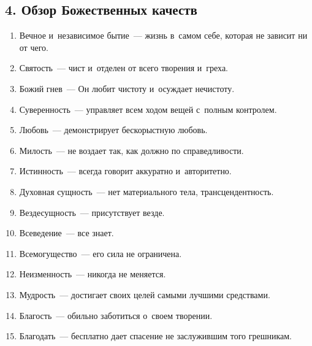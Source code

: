 \documentclass[a4paper,12pt]{article}
\begin{document}
\subsection{4.  Обзор Божественных качеств}
\begin{enumerate}
    \item Вечное и~независимое бытие~--- жизнь в~самом себе, которая не зависит ни от чего.
    \item Святость~--- чист и~отделен от всего творения и~греха.
    \item Божий гнев~--- Он любит чистоту и~осуждает нечистоту.
    \item Суверенность~--- управляет всем ходом вещей с~полным контролем.
    \item Любовь~--- демонстрирует бескорыстную любовь. 
    \item Милость~--- не воздает так, как должно по справедливости.
    \item Истинность~--- всегда говорит аккуратно и~авторитетно.
    \item Духовная сущность~--- нет материального тела, трансцендентность.
    \item Вездесущность~--- присутствует везде.
    \item Всеведение~--- все знает.
    \item Всемогущество~--- его сила не ограничена.
    \item Неизменность~--- никогда не меняется.
    \item Мудрость~--- достигает своих целей самыми лучшими средствами.
    \item Благость~--- обильно заботиться о~своем творении.
    \item Благодать~--- бесплатно дает спасение не заслужившим того грешникам.
\end{enumerate}
\end{document}
